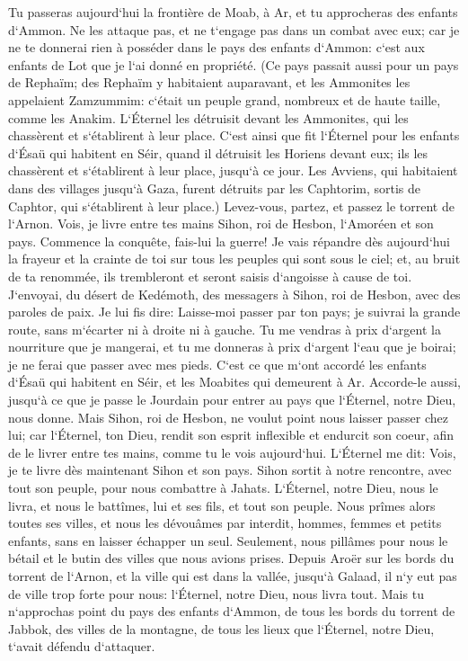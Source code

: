 \verse Tu passeras aujourd`hui la frontière de Moab, à Ar, 
\verse et tu approcheras des enfants d`Ammon. Ne les attaque pas, et ne t`engage pas dans un combat avec eux; car je ne te donnerai rien à posséder dans le pays des enfants d`Ammon: c`est aux enfants de Lot que je l`ai donné en propriété. 
\verse (Ce pays passait aussi pour un pays de Rephaïm; des Rephaïm y habitaient auparavant, et les Ammonites les appelaient Zamzummim: 
\verse c`était un peuple grand, nombreux et de haute taille, comme les Anakim. L`Éternel les détruisit devant les Ammonites, qui les chassèrent et s`établirent à leur place. 
\verse C`est ainsi que fit l`Éternel pour les enfants d`Ésaü qui habitent en Séir, quand il détruisit les Horiens devant eux; ils les chassèrent et s`établirent à leur place, jusqu`à ce jour. 
\verse Les Avviens, qui habitaient dans des villages jusqu`à Gaza, furent détruits par les Caphtorim, sortis de Caphtor, qui s`établirent à leur place.) 
\verse Levez-vous, partez, et passez le torrent de l`Arnon. Vois, je livre entre tes mains Sihon, roi de Hesbon, l`Amoréen et son pays. Commence la conquête, fais-lui la guerre! 
\verse Je vais répandre dès aujourd`hui la frayeur et la crainte de toi sur tous les peuples qui sont sous le ciel; et, au bruit de ta renommée, ils trembleront et seront saisis d`angoisse à cause de toi. 
\verse J`envoyai, du désert de Kedémoth, des messagers à Sihon, roi de Hesbon, avec des paroles de paix. Je lui fis dire: 
\verse Laisse-moi passer par ton pays; je suivrai la grande route, sans m`écarter ni à droite ni à gauche. 
\verse Tu me vendras à prix d`argent la nourriture que je mangerai, et tu me donneras à prix d`argent l`eau que je boirai; je ne ferai que passer avec mes pieds. 
\verse C`est ce que m`ont accordé les enfants d`Ésaü qui habitent en Séir, et les Moabites qui demeurent à Ar. Accorde-le aussi, jusqu`à ce que je passe le Jourdain pour entrer au pays que l`Éternel, notre Dieu, nous donne. 
\verse Mais Sihon, roi de Hesbon, ne voulut point nous laisser passer chez lui; car l`Éternel, ton Dieu, rendit son esprit inflexible et endurcit son coeur, afin de le livrer entre tes mains, comme tu le vois aujourd`hui. 
\verse L`Éternel me dit: Vois, je te livre dès maintenant Sihon et son pays. 
\verse Sihon sortit à notre rencontre, avec tout son peuple, pour nous combattre à Jahats. 
\verse L`Éternel, notre Dieu, nous le livra, et nous le battîmes, lui et ses fils, et tout son peuple. 
\verse Nous prîmes alors toutes ses villes, et nous les dévouâmes par interdit, hommes, femmes et petits enfants, sans en laisser échapper un seul. 
\verse Seulement, nous pillâmes pour nous le bétail et le butin des villes que nous avions prises. 
\verse Depuis Aroër sur les bords du torrent de l`Arnon, et la ville qui est dans la vallée, jusqu`à Galaad, il n`y eut pas de ville trop forte pour nous: l`Éternel, notre Dieu, nous livra tout. 
\verse Mais tu n`approchas point du pays des enfants d`Ammon, de tous les bords du torrent de Jabbok, des villes de la montagne, de tous les lieux que l`Éternel, notre Dieu, t`avait défendu d`attaquer. 

